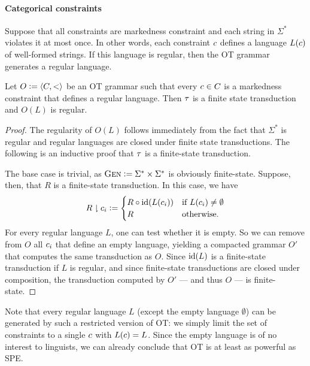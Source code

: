 \paragraph{Categorical constraints}
Suppose that all constraints are markedness constraint and each string in $\Sigma^*$ violates it at most once.
In other words, each constraint $c$ defines a language $L(c)$ of well-formed strings.
If this language is regular, then the OT grammar generates a regular language.
%
\begin{theorem}
    Let $O \mathrel{\mathop:}= \left \langle C,< \right \rangle $ be an OT grammar such that every $c \in C$ is a markedness constraint that defines a regular language.
    Then $\tau$ is a finite state transduction and $O(L)$ is regular.
\end{theorem}
%
\begin{proof}
    The regularity of $O(L)$ follows immediately from the fact that $\Sigma^*$ is regular and regular languages are closed under finite state transductions.
    The following is an inductive proof that $\tau$ is a finite-state transduction.
    
    The base case is trivial, as $\textsc{Gen} \mathrel{\mathop:}= \Sigma^* \times \Sigma^*$ is obviously finite-state.
    Suppose, then, that $R$ is a finite-state transduction.
    In this case, we have 
    \[
        R \downharpoonright c_i \mathrel{\mathop:}=
            \begin{cases}
                R \circ \mathrm{id}(L(c_i)) & \text{if } L(c_i) \neq \emptyset\\
                R & \text{otherwise.}
            \end{cases}
    \]
    For every regular language $L$, one can test whether it is empty.
    So we can remove from $O$ all $c_i$ that define an empty language, yielding a compacted grammar $O'$ that computes the same transduction as $O$.
    Since $\mathrm{id}(L)$ is a finite-state transduction if $L$ is regular, and since finite-state transductions are closed under composition, the transduction computed by $O'$ --- and thus $O$ --- is finite-state.
\end{proof}
%
Note that every regular language $L$ (except the empty language $\emptyset$) can be generated by such a restricted version of OT\@: we simply limit the set of constraints to a single $c$ with $L(c) = L$.
Since the empty language is of no interest to linguists, we can already conclude that OT is at least as powerful as SPE\@.

